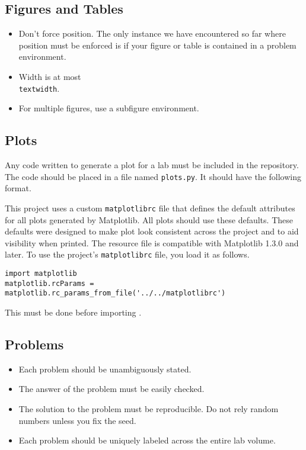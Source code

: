 \subsection{Figures and Tables}
\begin{itemize}
\item Don't force position.  The only instance we have encountered so far where position must be enforced is if your figure or table is contained in a problem environment.
\item Width is at most \texttt{\\textwidth}.
\item For multiple figures, use a subfigure environment.
\end{itemize}


\subsection{Plots}
Any code written to generate a plot for a lab must be included in the repository.
The code should be placed in a file named \texttt{plots.py}.
It should have the following format.


This project uses a custom \texttt{matplotlibrc} file that defines the default attributes for all plots generated by Matplotlib.
All plots should use these defaults.
These defaults were designed to make plot look consistent across the project and to aid visibility when printed.
The resource file is compatible with Matplotlib 1.3.0 and later.
To use the project's \texttt{matplotlibrc} file, you load it as follows.
\begin{lstlisting}
import matplotlib
matplotlib.rcParams = matplotlib.rc_params_from_file('../../matplotlibrc')
\end{lstlisting}
This must be done before importing .

\subsection{Problems}
\begin{itemize}
\item Each problem should be unambiguously stated.
\item The answer of the problem must be easily checked.
\item The solution to the problem must be reproducible.  Do not rely random numbers unless you fix the seed.
\item Each problem should be uniquely labeled across the entire lab volume.
\end{itemize}


